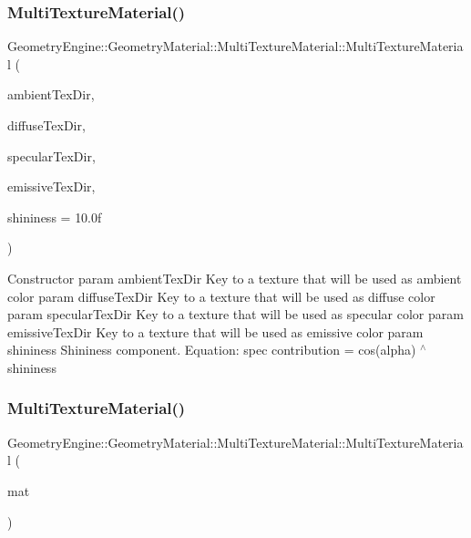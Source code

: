 \subsubsection{\texorpdfstring{MultiTextureMaterial()}{MultiTextureMaterial()}\hspace{0.1cm}{\footnotesize\ttfamily [1/3]}}
{\footnotesize\ttfamily Geometry\+Engine\+::\+Geometry\+Material\+::\+Multi\+Texture\+Material\+::\+Multi\+Texture\+Material (\begin{DoxyParamCaption}\item[{const std\+::string \&}]{ambient\+Tex\+Dir,  }\item[{const std\+::string \&}]{diffuse\+Tex\+Dir,  }\item[{const std\+::string \&}]{specular\+Tex\+Dir,  }\item[{const std\+::string \&}]{emissive\+Tex\+Dir,  }\item[{float}]{shininess = {\ttfamily 10.0f} }\end{DoxyParamCaption})}

Constructor param ambient\+Tex\+Dir Key to a texture that will be used as ambient color param diffuse\+Tex\+Dir Key to a texture that will be used as diffuse color param specular\+Tex\+Dir Key to a texture that will be used as specular color param emissive\+Tex\+Dir Key to a texture that will be used as emissive color param shininess Shininess component. Equation\+: spec contribution = cos(alpha) $^\wedge$ shininess \mbox{\label{class_geometry_engine_1_1_geometry_material_1_1_multi_texture_material_a78e60d57bd2dcbab07b96fd86426f453}} 
\subsubsection{\texorpdfstring{MultiTextureMaterial()}{MultiTextureMaterial()}\hspace{0.1cm}{\footnotesize\ttfamily [2/3]}}
{\footnotesize\ttfamily Geometry\+Engine\+::\+Geometry\+Material\+::\+Multi\+Texture\+Material\+::\+Multi\+Texture\+Material (\begin{DoxyParamCaption}\item[{const \mbox{\hyperlink{class_geometry_engine_1_1_geometry_material_1_1_multi_texture_material}{Multi\+Texture\+Material}} \&}]{mat }\end{DoxyParamCaption})}

